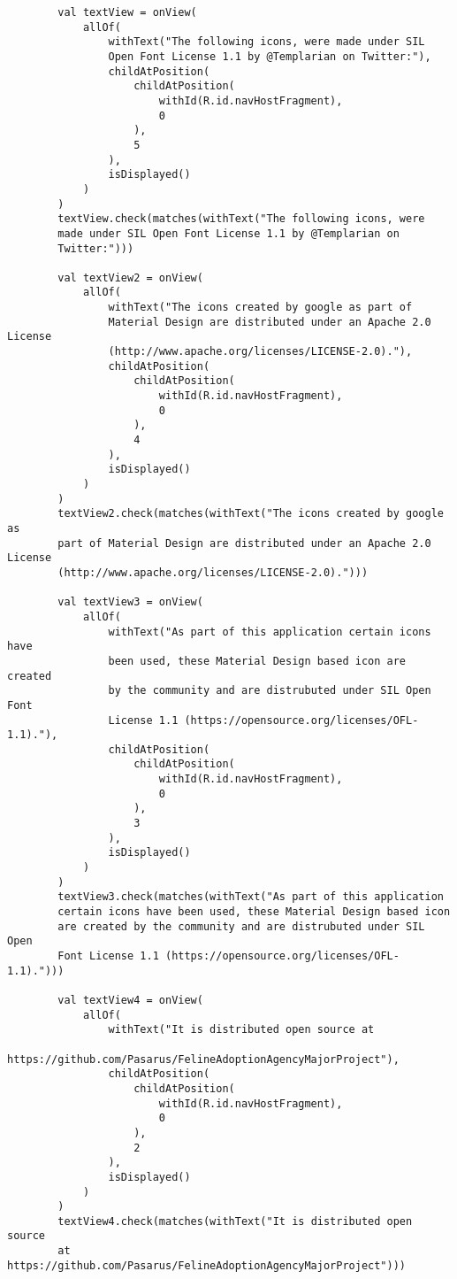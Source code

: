 \begin{verbatim}
        val textView = onView(
            allOf(
                withText("The following icons, were made under SIL
                Open Font License 1.1 by @Templarian on Twitter:"),
                childAtPosition(
                    childAtPosition(
                        withId(R.id.navHostFragment),
                        0
                    ),
                    5
                ),
                isDisplayed()
            )
        )
        textView.check(matches(withText("The following icons, were
        made under SIL Open Font License 1.1 by @Templarian on 
        Twitter:")))

        val textView2 = onView(
            allOf(
                withText("The icons created by google as part of 
                Material Design are distributed under an Apache 2.0 License
                (http://www.apache.org/licenses/LICENSE-2.0)."),
                childAtPosition(
                    childAtPosition(
                        withId(R.id.navHostFragment),
                        0
                    ),
                    4
                ),
                isDisplayed()
            )
        )
        textView2.check(matches(withText("The icons created by google as
        part of Material Design are distributed under an Apache 2.0 License
        (http://www.apache.org/licenses/LICENSE-2.0).")))

        val textView3 = onView(
            allOf(
                withText("As part of this application certain icons have
                been used, these Material Design based icon are created 
                by the community and are distrubuted under SIL Open Font 
                License 1.1 (https://opensource.org/licenses/OFL-1.1)."),
                childAtPosition(
                    childAtPosition(
                        withId(R.id.navHostFragment),
                        0
                    ),
                    3
                ),
                isDisplayed()
            )
        )
        textView3.check(matches(withText("As part of this application 
        certain icons have been used, these Material Design based icon
        are created by the community and are distrubuted under SIL Open
        Font License 1.1 (https://opensource.org/licenses/OFL-1.1).")))

        val textView4 = onView(
            allOf(
                withText("It is distributed open source at 
                https://github.com/Pasarus/FelineAdoptionAgencyMajorProject"),
                childAtPosition(
                    childAtPosition(
                        withId(R.id.navHostFragment),
                        0
                    ),
                    2
                ),
                isDisplayed()
            )
        )
        textView4.check(matches(withText("It is distributed open source 
        at https://github.com/Pasarus/FelineAdoptionAgencyMajorProject")))


\end{verbatim}
